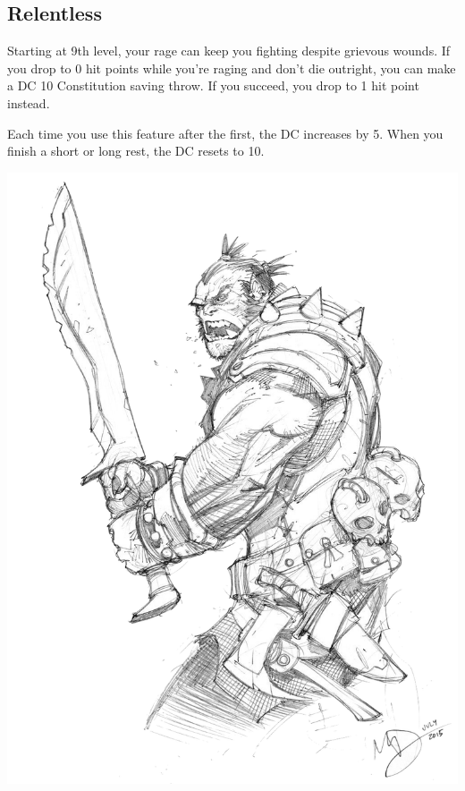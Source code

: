 \begin{multicols*}{2}
\subsection*{Relentless}

Starting at 9th level, your rage can keep you fighting despite grievous wounds. If you drop to 0 hit points while you’re raging and don’t die outright, you can make a DC 10 Constitution saving throw. If you succeed, you drop to 1 hit point instead.

Each time you use this feature after the first, the DC increases by 5. When you finish a short or long rest, the DC resets to 10.


\begin{Figure}
\centering
\includegraphics[width=\textwidth]{img/barbarian-half-orc.png}
\end{Figure}
    
\end{multicols*}